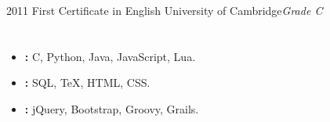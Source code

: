 \documentclass[11pt,a4paper]{moderncv}
\begin{document}
\cventry
    {2011}
    {First Certificate in English}
    {University of Cambridge}{}{}{\textit{Grade C}}

\section{}

\begin{itemize}
\item \textbf{:} C, Python, Java, JavaScript, Lua.
\item \textbf{:} SQL, TeX, HTML, CSS.
\item \textbf{:} jQuery, Bootstrap, Groovy, Grails.
\end{itemize}

\end{document}

